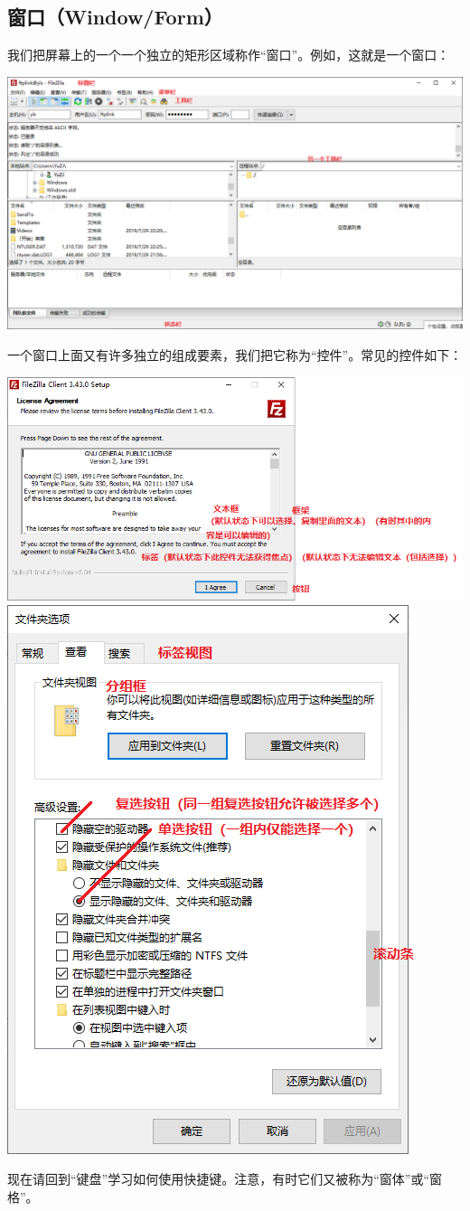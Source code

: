 \subsection{窗口（Window/Form）}
\label{sec:Frm}
我们把屏幕上的一个一个独立的矩形区域称作“窗口”。例如，这就是一个窗口：
\begin{center}
	\includegraphics[width=0.7\linewidth]{pic/kj1}
\end{center} \par
一个窗口上面又有许多独立的组成要素，我们把它称为“控件”。常见的控件如下：
\begin{center}
	\includegraphics[width=0.7\linewidth]{pic/kj2}\\\includegraphics[width=0.7\linewidth]{pic/kj3}
\end{center} \par
现在请回到“键盘”学习如何使用快捷键。注意，有时它们又被称为“窗体”或“窗格”。
